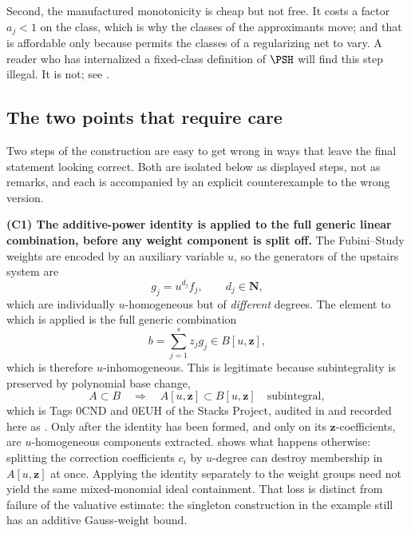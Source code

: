 Second, the manufactured monotonicity is cheap but not free.  It costs a
factor $a_j<1$ on the class, which is why the classes of the approximants
move; and that is affordable only because  permits the
classes of a regularizing net to vary.  A reader who has internalized a
fixed-class definition of $\PSH$ will find this step illegal.  It is not;
see .

\subsection{The two points that require care}
\label{sec:ch44-care}

Two steps of the construction are easy to get wrong in ways that leave the
final statement looking correct.  Both are isolated below as displayed
steps, not as remarks, and each is accompanied by an explicit
counterexample to the wrong version.

\medskip\noindent\textbf{(C1) The additive-power identity is applied to the
full generic linear combination, before any weight component is split off.}
The Fubini--Study weights are encoded by an auxiliary variable $u$, so the
generators of the upstairs system are
\[
 g_j=u^{d_j}f_j,
 \qquad
 d_j\in\mathbf N,
\]
which are individually $u$-homogeneous but of \emph{different} degrees.
The element to which  is applied is the full
generic combination
\[
 b=\sum_{j=1}^sz_jg_j\in B[u,\mathbf z],
\]
which is therefore $u$-inhomogeneous.  This is legitimate because
subintegrality is preserved by polynomial base change,
\[
 A\subset B
 \quad\Longrightarrow\quad
 A[u,\mathbf z]\subset B[u,\mathbf z]
 \quad\text{subintegral},
\]
which is Tags 0CND and 0EUH of the Stacks Project, audited in
 and recorded here as
.  Only after the identity has been
formed, and only on its $\mathbf z$-coefficients, are $u$-homogeneous
components extracted.   shows what happens
otherwise: splitting the correction coefficients $c_i$ by $u$-degree
can destroy membership in $A[u,\mathbf z]$ at once.
Applying the identity separately to the weight groups need not yield the
same mixed-monomial ideal containment.  That loss is distinct from
failure of the valuative estimate: the singleton construction in the
example still has an additive Gauss-weight bound.


